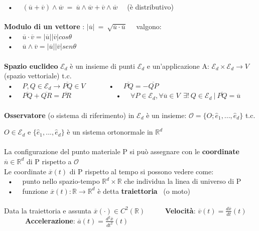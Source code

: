 \documentclass{article}
\begin{document}
\ • \ \ $(\overline{u}+\overline{v})\wedge \overline{w} \ = \ \overline{u}\wedge \overline{w} + \overline{v}\wedge\overline{w}$ \ \ (è distributivo)  \\ \\
%
%
%
\textbf{Modulo di un vettore} : $|\overline{u}| \ = \ \sqrt{\overline{u}\cdot\overline{u}} $ \ \ valgono: \\
\ • \ \ $\overline{u}\cdot\overline{v} = |\overline{u}||\overline{v}|cos\theta $ \\
\ • \ \ $\overline{u}\wedge\overline{v}=|\overline{u}||\overline{v}|sen\theta$ \\ \\
%
%
%
\textbf{Spazio euclideo} $\mathcal{E}_d$ è un insieme di punti $\mathcal{E}_d$ e un'applicazione A: $\mathcal{E}_d\times\mathcal{E}_d\rightarrow V$ (spazio vettoriale) t.c. \\
%
\ • \ \ $P,Q \in\mathcal{E}_d \rightarrow \overline{PQ}\in V$ \ \ \ \ \ \ • \ \ $\overline{PQ}=-\overline{QP}$ \\
\ • \ \ $\overline{PQ}+\overline{QR}=\overline{PR}$ \ \ \ \ \ \ \ \ \ \ \ \ • \ \ $\forall P \in \mathcal{E}_d, \forall \overline{u} \in V \ \ \exists! \ Q \in \mathcal{E}_d \ | \ \overline{PQ}=\overline{u}$ \\ \\
%
%
%
\textbf{Osservatore} (o sistema di riferimento) in $\mathcal{E}_d$ è un insieme: $\mathcal{O}= \{O; \hat{e}_1,...,\hat{e}_d \}$ t.c.

$O\in\mathcal{E}_d$ e $ \{\hat{e}_1,...,\hat{e}_d \} $ è un sistema ortonormale in $\mathbb{R}^d$ \\ \\
%
La configurazione del punto materiale P si può assegnare con le \textbf{coordinate} $\overline{n} \in\mathbb{R}^d$ di P rispetto a $\mathcal{O}$ \\
Le coordinate $\overline{x}(t)$ di P rispetto al tempo si possono vedere come:\\
\ • \ \ punto nello spazio-tempo $\mathbb{R}^d\times\mathbb{R}$ che individua la linea di universo di P \\
\ • \ \ funzione $\overline{x}(t): \mathbb{R}\rightarrow\mathbb{R}^d$ è detta \textbf{traiettoria} \ (o moto) \\ \\
%
Data la traiettoria e assunta $\overline{x}(\cdot) \in C^2(\mathbb{R})$ \ \ \ \ \
\textbf{Velocità}: $\overline{v}(t) = \frac{d\overline{x}}{dt}(t)$ \ \ \ \ \ \ \textbf{Accelerazione}: $\overline{a}(t) = \frac{d^2\overline{x}}{dt^2}(t)$
\end{document}
